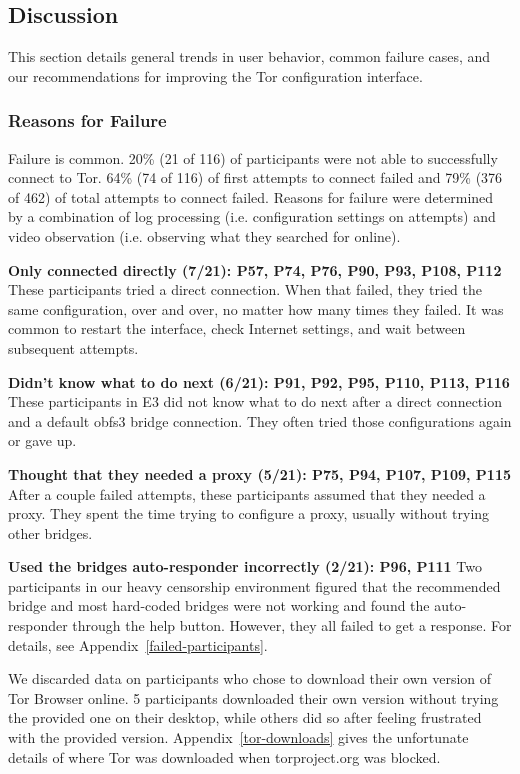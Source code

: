 \documentclass[USenglish,oneside,twocolumn]{article}
\begin{document}
\subsection{Discussion} 
This section details general trends in user behavior, common failure cases, and our recommendations for 
improving the Tor configuration interface. 

\subsubsection{Reasons for Failure} 
Failure is common. 20\% (21 of 116) of participants were not able to successfully connect to Tor. 64\% (74 of 116) of first attempts to connect failed and 79\% (376 of 462) of total attempts to connect failed. Reasons for failure were determined by a combination of log processing (i.e. configuration settings on attempts) and video observation (i.e. observing what they searched for online). \\ 

\begin{description}
\item {\bfseries Only connected directly (7/21): P57, P74, P76, P90, P93, P108, P112} These participants tried a direct connection. When that failed, they tried the same configuration, over and over, no matter how many times they failed. It was common to restart the interface, check Internet settings, and wait between subsequent attempts. 
\item {\bfseries Didn't know what to do next (6/21): P91, P92, P95, P110, P113, P116} These participants in E3 did not know what to do next after a direct connection and a default obfs3 bridge connection. They often tried those configurations again or gave up. 
\item {\bfseries Thought that they needed a proxy (5/21): P75, P94, P107, P109, P115} After a couple failed attempts, these participants assumed that they needed a proxy. They spent the time trying to configure a proxy, usually without trying other bridges. 
\item {\bfseries Used the bridges auto-responder incorrectly (2/21): P96, P111} Two participants in our heavy censorship environment figured that the recommended bridge and most hard-coded bridges were not working and found the auto-responder through the help button. However, they all failed to get a response. For details, see Appendix~\ref{failed-participants}.
\end{description} 

We discarded data on participants who chose to download their own version of Tor Browser online. 5 participants downloaded their own version without trying the provided one on their desktop, while others did so after feeling frustrated with the provided version. Appendix~\ref{tor-downloads} gives the unfortunate details of where Tor was downloaded when torproject.org was blocked.
\end{document}
